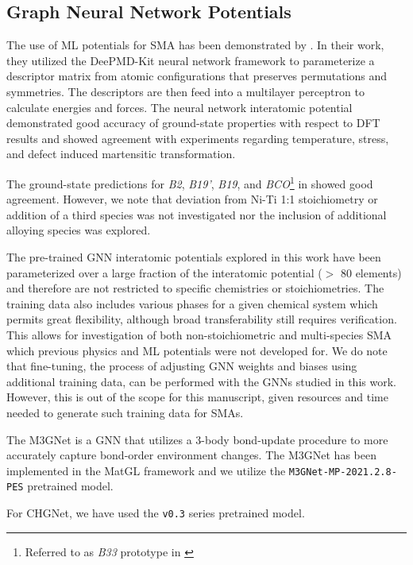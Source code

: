 \documentclass[preprint,colorlinks=true,linkcolor=black,citecolor=black]{elsarticle}
\begin{document}
\subsection{Graph Neural Network Potentials}

The use of ML potentials for SMA has been demonstrated by
\citet{Tang2022}. In their work, they utilized the
DeePMD-Kit\cite{Wang2018} neural network framework to parameterize a
descriptor matrix from atomic configurations that preserves
permutations and symmetries. The descriptors are then feed into
a multilayer perceptron to calculate energies and forces. The neural
network interatomic potential demonstrated good accuracy of
ground-state properties with respect to DFT results and showed
agreement with experiments regarding temperature, stress, and defect
induced martensitic transformation. \paragraphmark

The ground-state predictions for
\textit{B2}, \textit{B19'}, \textit{B19}, and
\textit{BCO}\footnote{Referred to as \textit{B33} prototype in
	\citet{Tang2022}} in \citet{Tang2022} showed good agreement. However,
we note that deviation from Ni-Ti 1:1 stoichiometry or addition of a
third species was not investigated nor the inclusion of additional
alloying species was explored. \par

The pre-trained GNN interatomic potentials explored in this work have
been parameterized over a large fraction of the interatomic potential
($>$ 80 elements) and therefore are not restricted to specific
chemistries or stoichiometries. The training data also includes
various phases for a given chemical system which permits great
flexibility, although broad transferability still requires verification.
This allows for investigation of both non-stoichiometric and multi-species
SMA which previous physics and ML potentials were not developed for. We do
note that fine-tuning, the process of adjusting GNN weights and biases
using additional training data, can be performed
with the GNNs studied in this work. However, this is out of the scope
for this manuscript, given resources and time needed to generate such
training data for SMAs. \par

The M3GNet is a GNN that utilizes a 3-body bond-update procedure to
more accurately capture bond-order environment changes. The M3GNet has
been implemented in the MatGL framework and we utilize the
\texttt{M3GNet-MP-2021.2.8-PES} pretrained model.

For CHGNet, we have used the \texttt{v0.3} series pretrained model.
\end{document}
